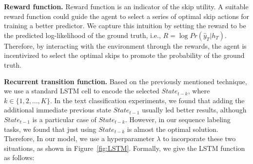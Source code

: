\documentclass[letterpaper]{article} \usepackage{aaai19}  \usepackage{times}  \usepackage{helvet}  \usepackage{courier}  \usepackage{url}  \usepackage{graphicx}  \usepackage{amsmath}
\begin{document}
\noindent \textbf{Reward function.} Reward function is an indicator of the skip utility. A suitable reward function could guide the agent to select a series of optimal skip actions for training a better predictor. We capture this intuition by setting the reward to be the predicted log-likelihood of the ground truth, i.e., $R = \log Pr(\hat{y}_T|h_T)$. Therefore, by interacting with the environment through the rewards, the agent is incentivized to select the optimal skips to promote the probability of the ground truth.


\noindent \textbf{Recurrent transition function.} Based on the previously mentioned technique, we use a standard LSTM cell to encode the selected $State_{t-k}$, where $k\in\{1,2,...,K\}$. In the text classification experiments, we found that adding the additional immediate previous state $State_{t-1}$ usually led better results, although $State_{t-1}$ is a particular case of $State_{t-k}$. However, in our sequence labeling tasks, we found that just using $State_{t-k}$ is almost the optimal solution. Therefore, In our model, we use a hyperparameter $\lambda$ to incorporate these two situations, as shown in Figure~\ref{fig:LSTM}. Formally, we give the LSTM function as follows:
\end{document}
